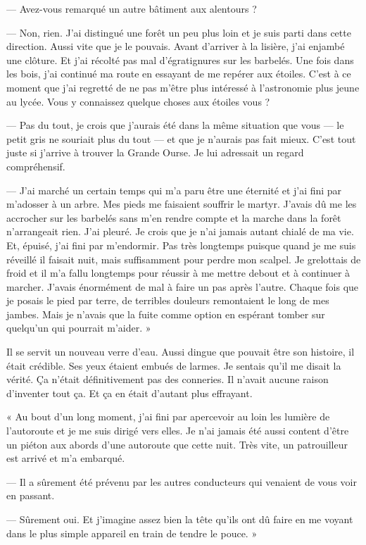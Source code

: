 — Avez-vous remarqué un autre bâtiment aux alentours ?

— Non, rien. J'ai distingué une forêt un peu plus loin et je suis parti dans cette direction. Aussi vite que je le
pouvais. Avant d'arriver à la lisière, j'ai enjambé une clôture. Et j'ai récolté pas mal d'égratignures sur les
barbelés. Une fois dans les bois, j'ai continué ma route en essayant de me repérer aux étoiles. C'est à ce moment que
j'ai regretté de ne pas m'être plus intéressé à l'astronomie plus jeune au lycée. Vous y connaissez quelque choses aux
étoiles vous ?

— Pas du tout, je crois que j'aurais été dans la même situation que vous — le petit gris ne souriait plus du tout — et
que je n'aurais pas fait mieux. C'est tout juste si j'arrive à trouver la Grande Ourse. Je lui adressait un regard
compréhensif.

— J'ai marché un certain temps qui m'a paru être une éternité et j'ai fini par m'adosser à un arbre. Mes pieds me
faisaient souffrir le martyr. J'avais dû me les accrocher sur les barbelés sans m'en rendre compte et la marche dans la
forêt n'arrangeait rien. J'ai pleuré. Je crois que je n'ai jamais autant chialé de ma vie. Et, épuisé, j'ai fini par
m'endormir. Pas très longtemps puisque quand je me suis réveillé il faisait nuit, mais suffisamment pour perdre mon
scalpel. Je grelottais de froid et il m'a fallu longtemps pour réussir à me mettre debout et à continuer à marcher.
J'avais énormément de mal à faire un pas après l'autre. Chaque fois que je posais le pied par terre, de terribles
douleurs remontaient le long de mes jambes. Mais je n'avais que la fuite comme option en espérant tomber sur quelqu'un
qui pourrait m'aider. »

Il se servit un nouveau verre d'eau. Aussi dingue que pouvait être son histoire, il était crédible. Ses yeux étaient
embués de larmes. Je sentais qu'il me disait la vérité. Ça n'était définitivement pas des conneries. Il n'avait aucune
raison d'inventer tout ça. Et ça en était d'autant plus effrayant.

« Au bout d'un long moment, j'ai fini par apercevoir au loin les lumière de l'autoroute et je me suis dirigé vers elles.
Je n'ai jamais été aussi content d'être un piéton aux abords d'une autoroute que cette nuit. Très vite, un patrouilleur
est arrivé et m'a embarqué.

— Il a sûrement été prévenu par les autres conducteurs qui venaient de vous voir en passant.

— Sûrement oui. Et j'imagine assez bien la tête qu'ils ont dû faire en me voyant dans le plus simple appareil en train
de tendre le pouce. »

